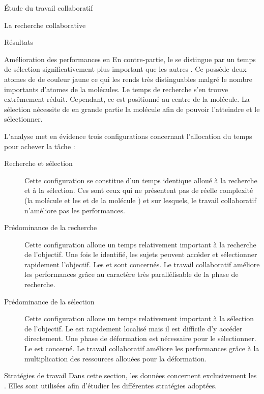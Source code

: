 \documentclass[myfrancais]{mythesis}
\begin{document}
\begin{mypart}{Étude du travail collaboratif}
\begin{mychapter}{La recherche collaborative}
\begin{mysection}{Résultats}
\begin{mysubsection}{Amélioration des performances en }
					En contre-partie, le   se distingue par un temps de sélection significativement plus important que les autres .
					Ce  possède deux atomes de  de couleur jaune ce qui les rends très distinguables malgré le nombre importants d'atomes de la molécules.
					Le temps de recherche s'en trouve extrêmement réduit.
					Cependant, ce  est positionné au centre de la molécule.
					La sélection nécessite de  en grande partie la molécule afin de pouvoir l'atteindre et le sélectionner.

					L'analyse met en évidence trois configurations concernant l'allocation du temps pour achever la tâche :
					\begin{description}
						\item[Recherche et sélection]
							Cette configuration se constitue d'un temps identique alloué à la recherche et à la sélection.
							Ces  sont ceux qui ne présentent pas de réelle complexité (la molécule \myTRPCAGE et les   et  de la molécule \myPrion) et sur lesquels, le travail collaboratif n'améliore pas les performances.
						\item[Prédominance de la recherche]
							Cette configuration alloue un temps relativement important à la recherche de l'objectif.
							Une fois le  identifié, les sujets peuvent accéder et sélectionner rapidement l'objectif.
							Les   et  sont concernés.
							Le travail collaboratif améliore les performances grâce au caractère très parallélisable de la phase de recherche.
						\item[Prédominance de la sélection]
							Cette configuration alloue un temps relativement important à la sélection de l'objectif.
							Le  est rapidement localisé mais il est difficile d'y accéder directement.
							Une phase de déformation est nécessaire pour le sélectionner.
							Le   est concerné.
							Le travail collaboratif améliore les performances grâce à la multiplication des ressources allouées pour la déformation.
					\end{description}
				\end{mysubsection}
				\begin{mysubsection}{Stratégies de travail}
					Dans cette section, les données concernent exclusivement les .
					Elles sont utilisées afin d'étudier les différentes stratégies adoptées.


\end{mysubsection}
\end{mysection}
\end{mychapter}
\end{mypart}
\end{document}
